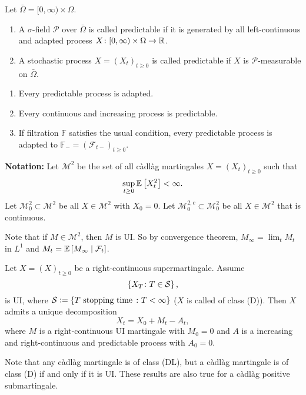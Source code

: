 \begin{defn}
    Let $\bar{\Omega} = [0,\infty) \times \Omega$. 
    \begin{enumerate}[label=(\arabic{*})]
    	\item A $\sigma$-field $\mathcal{P}$ over $\bar{\Omega}$ is called predictable if it is generated by all left-continuous and adapted process $X \colon [0,\infty) \times \Omega \rightarrow \mathbb{R}$.
    	\item A stochastic process $X=(X_t)_{t \geq 0}$ is called predictable if $X$ is $\mathcal{P}$-measurable on $\bar{\Omega}$.
    \end{enumerate}
\end{defn}
\begin{rmk}
    \begin{enumerate}[label=(\roman*)]
    	\item Every predictable process is adapted.
    	\item Every continuous and increasing process is predictable.
    	\item If filtration $\mathbb{F}$ satisfies the usual condition, every predictable process is adapted to $\mathbb{F}_- = (\mathcal{F}_{t-})_{t \geq 0 }$.
    \end{enumerate}
\end{rmk}

\noindent \textbf{Notation:} Let $\mathcal{M}^2$ be the set of all c\`adl\`ag martingales $X=(X_t)_{t \geq 0}$ such that
\begin{equation*}
	\sup_{t \geq 0} \mathbb{E}\left[X_t^2\right] < \infty.
\end{equation*}
Let $\mathcal{M}_0^2 \subset \mathcal{M}^2$ be all $X \in \mathcal{M}^2$ with $X_0 = 0$. Let $\mathcal{M}^{2,c}_0 \subset \mathcal{M}_0^2$ be all $X \in \mathcal{M}^2$ that is continuous.
\begin{rmk}
    Note that if $M \in \mathcal{M}^2$, then $M$ is UI. So by convergence theorem, $M_\infty = \lim_t M_t$ in $L^1$ and $M_t = \mathbb{E}\left[M_\infty \mid \mathcal{F}_t\right]$.
\end{rmk}

\begin{thm}
    Let $X=(X)_{t \geq 0}$ be a right-continuous supermartingale. Assume 
    \begin{equation*}
    	\left\{X_T \colon T \in \mathcal{S}\right\},
    \end{equation*}
    is UI, where $\mathcal{S} \vcentcolon= \left\{T \text{ stopping time } \colon T < \infty\right\}$ ($X$ is called of class (D)). Then $X$ admits a unique decomposition
    \begin{equation*}
    	X_t = X_0 + M_t - A_t,
    \end{equation*}
    where $M$ is a right-continuous UI martingale with $M_0 = 0$ and $A$ is a increasing and right-continuous and predictable process with $A_0 = 0$.
\end{thm} 
\begin{rmk}
    Note that any c\`adl\`ag martingale is of class (DL), but a c\`adl\`ag martingale is of class (D) if and only if it is UI. These results are also true for a c\`adl\`ag positive submartingale.
\end{rmk}

